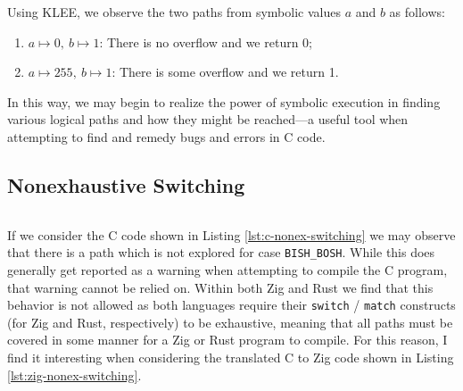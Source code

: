 \documentclass[conference]{IEEEtran}
\newenvironment{code}{\captionsetup{type=listing}}{}
\begin{document}
\begin{code}
    \medskip
    \inputminted{c}{../code-examples/c-klee/advanced_integer_overflow.c}
    \label{lst:c-branched-overflow}
    \medskip
\end{code}

Using KLEE, we observe the two paths from symbolic values $a$ and $b$ as follows:
\begin{enumerate}
    \item $a\mapsto0,\ b\mapsto1$: There is no overflow and we return 0;
    \item $a\mapsto255,\ b\mapsto1$: There is some overflow and we return 1.
\end{enumerate}
In this way, we may begin to realize the power of symbolic execution in finding various
logical paths and how they might be reached---a useful tool when attempting to find and
remedy bugs and errors in C code.


\subsection{Nonexhaustive Switching}
\begin{code}
    \medskip
    \inputminted{c}{../code-examples/c/nonexhaustive-switching.c}
    \label{lst:c-nonex-switching}
    \medskip
\end{code}

If we consider the C code shown in Listing \ref{lst:c-nonex-switching} we may observe that there
is a path which is not explored for case \texttt{BISH\_BOSH}. While this does generally get
reported as a warning when attempting to compile the C program, that warning cannot be relied on.
Within both Zig and Rust we find that this behavior is not allowed as both languages require
their \texttt{switch} / \texttt{match} constructs (for Zig and Rust, respectively) to be
exhaustive, meaning that all paths must be covered in some manner for a Zig or Rust program to
compile. For this reason, I find it interesting when considering the translated C to Zig code
shown in Listing \ref{lst:zig-nonex-switching}.

\begin{code}
    \medskip
    \inputminted[firstline=64,lastline=78]{zig}{../code-examples/zig-translations/nonexhaustive-switching.zig}
    \label{lst:zig-nonex-switching}
    \medskip
\end{code}
\end{document}
